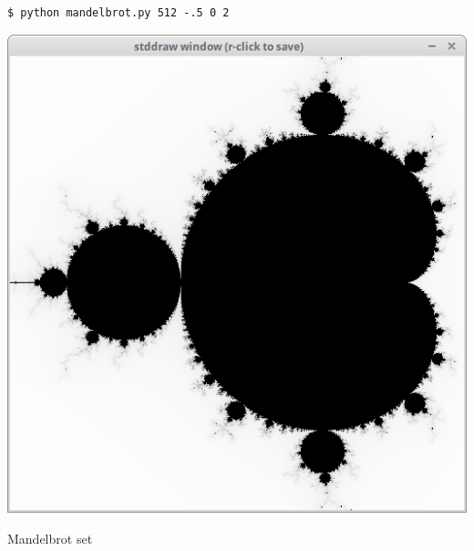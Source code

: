 \documentclass[8pt,a4paper,compress,handout]{beamer}
\begin{document}
\begin{frame}[fragile]
\begin{minipage}{200pt}
\begin{lstlisting}[language={}]
$ python mandelbrot.py 512 -.5 0 2
\end{lstlisting}
\end{minipage}%
\hfill
\begin{minipage}{100pt}
\begin{center}
\includegraphics[scale=0.2]{figures/mandelbrot1.png}

\smallskip

\tiny Mandelbrot set
\end{center}
\end{minipage}%

\bigskip


\end{frame}
\end{document}
